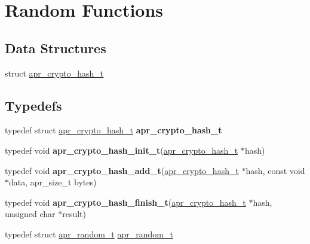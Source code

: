 \hypertarget{group__apr__random}{}\section{Random Functions}
\label{group__apr__random}
\subsection*{Data Structures}
\begin{DoxyCompactItemize}
\item 
struct \hyperlink{structapr__crypto__hash__t}{apr\+\_\+crypto\+\_\+hash\+\_\+t}
\end{DoxyCompactItemize}
\subsection*{Typedefs}
\begin{DoxyCompactItemize}
\item 
typedef struct \hyperlink{structapr__crypto__hash__t}{apr\+\_\+crypto\+\_\+hash\+\_\+t} {\bfseries apr\+\_\+crypto\+\_\+hash\+\_\+t}\hypertarget{group__apr__random_ga30fbaf80424a9f1a0e9cc51072f65127}{}\label{group__apr__random_ga30fbaf80424a9f1a0e9cc51072f65127}

\item 
typedef void {\bfseries apr\+\_\+crypto\+\_\+hash\+\_\+init\+\_\+t}(\hyperlink{structapr__crypto__hash__t}{apr\+\_\+crypto\+\_\+hash\+\_\+t} $\ast$hash)\hypertarget{group__apr__random_gad2775bc1cdb376d9dec0e97283b4bdd9}{}\label{group__apr__random_gad2775bc1cdb376d9dec0e97283b4bdd9}

\item 
typedef void {\bfseries apr\+\_\+crypto\+\_\+hash\+\_\+add\+\_\+t}(\hyperlink{structapr__crypto__hash__t}{apr\+\_\+crypto\+\_\+hash\+\_\+t} $\ast$hash, const void $\ast$data, apr\+\_\+size\+\_\+t bytes)\hypertarget{group__apr__random_ga2f8a4fb18078a76357327ea55936c1ea}{}\label{group__apr__random_ga2f8a4fb18078a76357327ea55936c1ea}

\item 
typedef void {\bfseries apr\+\_\+crypto\+\_\+hash\+\_\+finish\+\_\+t}(\hyperlink{structapr__crypto__hash__t}{apr\+\_\+crypto\+\_\+hash\+\_\+t} $\ast$hash, unsigned char $\ast$result)\hypertarget{group__apr__random_gab70ea9133870efdb5532d20d4bcf7442}{}\label{group__apr__random_gab70ea9133870efdb5532d20d4bcf7442}

\item 
typedef struct \hyperlink{group__apr__random_ga33073741e56b1bafe52ba58cefcbbf96}{apr\+\_\+random\+\_\+t} \hyperlink{group__apr__random_ga33073741e56b1bafe52ba58cefcbbf96}{apr\+\_\+random\+\_\+t}
\end{DoxyCompactItemize}
